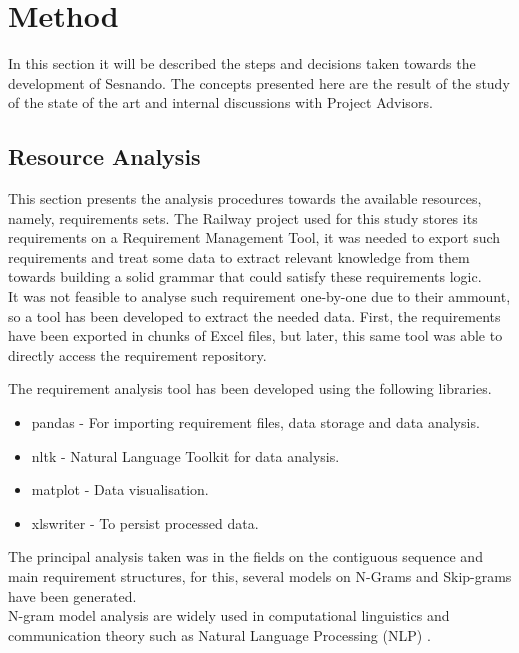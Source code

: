 \section{Method}
\label{sec:method}

In this section it will be described the steps and decisions taken towards the development of Sesnando. The concepts presented here are the result of the study of the state of the art and internal discussions with Project Advisors.


\subsection{Resource Analysis}
\label{subsec:resource_analysis}

This section presents the analysis procedures towards the available resources, namely, requirements sets. The Railway project used for this study stores its requirements on a Requirement Management Tool, it was needed to export such requirements and treat some data to extract relevant knowledge from them towards building a solid grammar that could satisfy these requirements logic.\\

It was not feasible to analyse such requirement one-by-one due to their ammount, so a tool has been developed to extract the needed data. First, the requirements have been exported in chunks of Excel files, but later, this same tool was able to directly access the requirement repository.

The requirement analysis tool has been developed using the following libraries.

\begin{itemize}
    \item pandas - For importing requirement files, data storage and data analysis.
    \item nltk - Natural Language Toolkit for data analysis.
    \item matplot - Data visualisation.
    \item xlswriter - To persist processed data.
\end{itemize}

The principal analysis taken was in the fields on the contiguous sequence and main requirement structures, for this, several models on N-Grams and Skip-grams have been generated.\\
N-gram model analysis are widely used in computational linguistics and communication theory such as Natural Language Processing (NLP) \cite{broder_syntactic_1997}.\\

